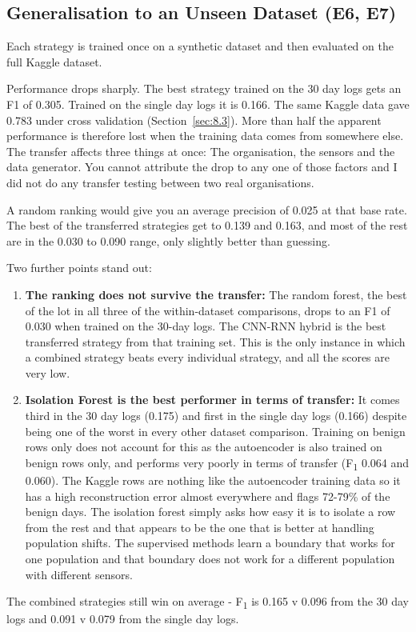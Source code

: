 \documentclass[a4paper,12pt]{article}
\newcommand{\resultinput}[1]{{\let\small\footnotesize\setlength{\tabcolsep}{4pt}}}
\begin{document}
\subsection{Generalisation to an Unseen Dataset (E6, E7)}
\label{sec:8.5}

Each strategy is trained once on a synthetic dataset and then evaluated on the full Kaggle dataset.

\resultinput{tables/generalMonth}

\resultinput{tables/generalSingleDay}

Performance drops sharply. The best strategy trained on the 30 day logs gets an F1 of 0.305. Trained on the single day logs it is 0.166. The same Kaggle data gave 0.783 under cross validation (Section~\ref{sec:8.3}). More than half the apparent performance is therefore lost when the training data comes from somewhere else. The transfer affects three things at once: The organisation, the sensors and the data generator. You cannot attribute the drop to any one of those factors and I did not do any transfer testing between two real organisations.

A random ranking would give you an average precision of 0.025 at that base rate. The best of the transferred strategies get to 0.139 and 0.163, and most of the rest are in the 0.030 to 0.090 range, only slightly better than guessing.

Two further points stand out:

\begin{enumerate}
  \item \textbf{The ranking does not survive the transfer:} The random forest, the best of the lot in all three of the within-dataset comparisons, drops to an F1 of 0.030 when trained on the 30-day logs. The CNN-RNN hybrid is the best transferred strategy from that training set. This is the only instance in which a combined strategy beats every individual strategy, and all the scores are very low.
  \item \textbf{Isolation Forest is the best performer in terms of transfer:} It comes third in the 30 day logs (0.175) and first in the single day logs (0.166) despite being one of the worst in every other dataset comparison. Training on benign rows only does not account for this as the autoencoder is also trained on benign rows only, and performs very poorly in terms of transfer (F\textsubscript{1} 0.064 and 0.060). The Kaggle rows are nothing like the autoencoder training data so it has a high reconstruction error almost everywhere and flags 72-79\% of the benign days. The isolation forest simply asks how easy it is to isolate a row from the rest and that appears to be the one that is better at handling population shifts. The supervised methods learn a boundary that works for one population and that boundary does not work for a different population with different sensors.
\end{enumerate}
The combined strategies still win on average - F\textsubscript{1} is 0.165 v 0.096 from the 30 day logs and 0.091 v 0.079 from the single day logs.
\end{document}
